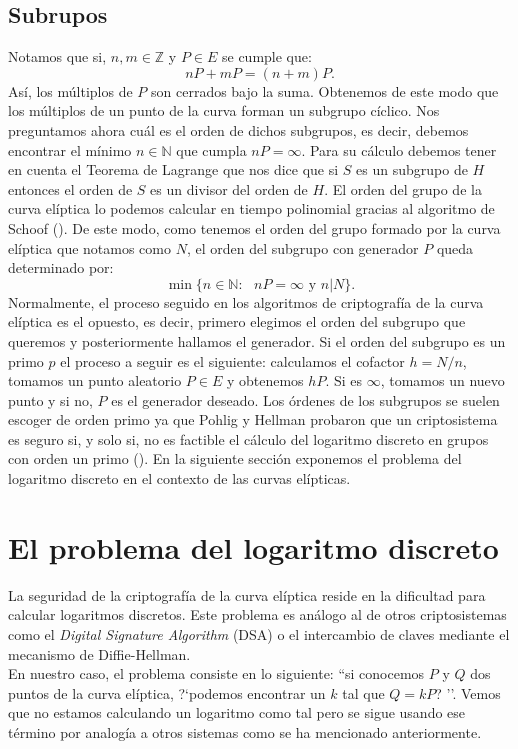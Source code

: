 \documentclass[11pt]{article}
\begin{document}
\subsection{Subrupos}
Notamos que si, $ n, m \in \mathbb{Z} $ y $ P \in E $ se cumple que:
\[
nP + mP = (n+m)P.
\]
Así, los múltiplos de $ P $ son cerrados bajo la suma. Obtenemos de este modo que los múltiplos de un punto de la curva forman un subgrupo cíclico. Nos preguntamos ahora cuál es el orden de dichos subgrupos, es decir, debemos encontrar el mínimo $ n \in \mathbb{N} $ que cumpla $ nP = \infty $. Para su cálculo debemos tener en cuenta el Teorema de Lagrange que nos dice que si $ S $ es un subgrupo de $ H $ entonces el orden de $ S $ es un divisor del orden de $ H $. El orden del grupo de la curva elíptica lo podemos calcular en tiempo polinomial gracias al algoritmo de Schoof (\cite{schoof_group_order}). De este modo, como tenemos el orden del grupo formado por la curva elíptica que notamos como $ N $, el orden del subgrupo con generador $ P $ queda determinado por:
\[
\min\{ n \in \mathbb{N}:\text{ } nP = \infty \text{ y } n | N\}.
\]
Normalmente, el proceso seguido en los algoritmos de criptografía de la curva elíptica es el opuesto, es decir, primero elegimos el orden del subgrupo que queremos y posteriormente hallamos el generador. Si el orden del subgrupo es un primo $ p $ el proceso a seguir es el siguiente: calculamos el cofactor $ h = N/n $, tomamos un punto aleatorio $ P \in E $ y obtenemos $ hP $. Si es $\infty$, tomamos un nuevo punto y si no, $ P $ es el generador deseado. Los órdenes de los subgrupos se suelen escoger de orden primo ya que Pohlig y Hellman probaron que un criptosistema es seguro si, y solo si, no es factible el cálculo del logaritmo discreto en grupos con orden un primo (\cite{pohlig1978improved}). En la siguiente sección exponemos el problema del logaritmo discreto en el contexto de las curvas elípticas. \\
\section{El problema del logaritmo discreto}
\label{sec:log}
La seguridad de la criptografía de la curva elíptica reside en la dificultad para calcular logaritmos discretos. Este problema es análogo al de otros criptosistemas como el \textit{Digital Signature Algorithm} (DSA) o el intercambio de claves mediante el mecanismo de Diffie-Hellman.\\

En nuestro caso, el problema consiste en lo siguiente: ``si conocemos $ P $ y $ Q $ dos puntos de la curva elíptica, ?`podemos encontrar un $ k $ tal que $ Q = kP $? ''. Vemos que no estamos calculando un logaritmo como tal pero se sigue usando ese término por analogía a otros sistemas como se ha mencionado anteriormente.\\
\end{document}
